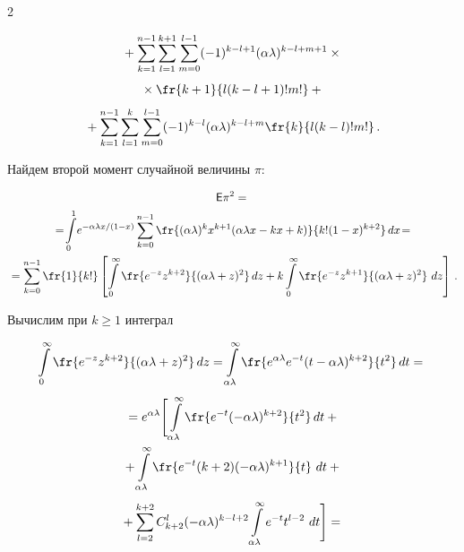 \begin{multicols}{2}
{\begin{multline*}
{}+\sum_{k=1}^{n-1}\sum_{l=1}^{k+1}\sum_{m=0}^{l-1}(-1)^{k-l+1}(\alpha\lambda)^{k-l+m+1}\times{}\\[4pt]


{}\times \fr{k+1}


{l(k-l+1)!m!}+{}\\[4pt]


{}+


\sum_{k=1}^{n-1}\sum_{l=1}^k\sum_{m=0}^{l-1}(-1)^{k-l}(\alpha\lambda)^{k-l+m}\fr{k}{l(k-l)!m!}\,.


\end{multline*}


}




%


Найдем второй момент случайной величины $\pi$:


\begin{multline*}


\e\pi^2={}\\


{}=\!\il{0}{1}\!e^{-\alpha\lambda x /(1-x)}\sum_{k=0}^{n-1}\fr{(\alpha\lambda)^k x^{k+1}(\alpha\lambda


x-kx+k)}{k!(1-x)^{k+2}}\,dx\!={}\\%


{}=\sum_{k=0}^{n-1}\fr{1}{k!}\left[\il{0}{\infty}\fr{e^{-z}z^{k+2}}{(\alpha\lambda+z)^2}\,dz


+k\il{0}{\infty}\fr{e^{-z}z^{k+1}}{(\alpha\lambda+z)^2}\ dz\right]\,.


\end{multline*}


%


Вычислим при $k\ge1$ интеграл


\begin{multline*}


\il{0}{\infty}\fr{e^{-z}z^{k+2}}{(\alpha\lambda+z)^2}\,dz=


\il{\alpha\lambda}{\infty}\fr{e^{\alpha\lambda}e^{-t}(t-\alpha\lambda)^{k+2}}{t^2}\,dt={} \\[4pt]


{}=e^{\alpha\lambda}\Bigg[\il{\alpha\lambda}{\infty}\fr{e^{-t}(-\alpha\lambda)^{k+2}}{t^2}\,dt+{}\\


{}+\il{\alpha\lambda}{\infty}\fr{e^{-t}(k+2)(-\alpha\lambda)^{k+1}}{t}\ dt+{} \\[4pt]


{}+\sum_{l=2}^{k+2}C_{k+2}^l(-\alpha\lambda)^{k-l+2}\il{\alpha\lambda}{\infty}e^{-t}t^{l-2}\ dt\Bigg]={} \\[4pt]



\end{multline*}
\end{multicols}
